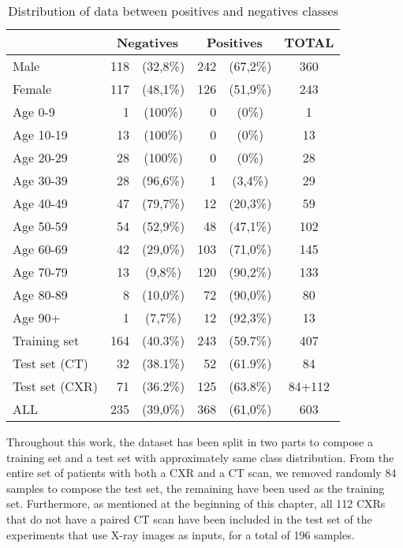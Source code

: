 \begin{table}
    \centering
    \begin{tabular}{|l|r c|r c|c|}
        \hline
        & \multicolumn{2}{c|}{\textbf{Negatives}} & \multicolumn{2}{c|}{\textbf{Positives}} & \textbf{TOTAL} \\
        \hline
        Male    & 118 & (32,8\%) & 242 & (67,2\%) & 360 \\
        Female  & 117 & (48,1\%) & 126 & (51,9\%) & 243 \\
        \hline
        Age 0-9   &   1 &  (100\%) &   0 &    (0\%) &   1 \\
        Age 10-19 &  13 &  (100\%) &   0 &    (0\%) &  13 \\
        Age 20-29 &  28 &  (100\%) &   0 &    (0\%) &  28 \\
        Age 30-39 &  28 & (96,6\%) &   1 &  (3,4\%) &  29 \\
        Age 40-49 &  47 & (79,7\%) &  12 & (20,3\%) &  59 \\
        Age 50-59 &  54 & (52,9\%) &  48 & (47,1\%) & 102 \\
        Age 60-69 &  42 & (29,0\%) & 103 & (71,0\%) & 145 \\
        Age 70-79 &  13 &  (9,8\%) & 120 & (90,2\%) & 133 \\
        Age 80-89 &   8 & (10,0\%) &  72 & (90,0\%) &  80 \\
        Age 90+   &   1 &  (7,7\%) &  12 & (92,3\%) &  13 \\
        \hline
        \hline
        Training set   & 164 & (40.3\%) & 243 & (59.7\%) &    407 \\
        Test set (CT)  &  32 & (38.1\%) &  52 & (61.9\%) &     84 \\
        Test set (CXR) &  71 & (36.2\%) & 125 & (63.8\%) & 84+112 \\
        \hline
        \hline
        ALL       & 235 & (39,0\%) & 368 & (61,0\%) & 603 \\
        \hline
    \end{tabular}
    \caption{Distribution of data between positives and negatives classes}
    \label{tab:pos_neg_distribution}
\end{table}

Throughout this work, the dataset has been split in two parts to compose a training set and a test set with approximately same class distribution.
From the entire set of patients with both a CXR and a CT scan, we removed randomly 84 samples to compose the test set, the remaining have been used as the training set.
Furthermore, as mentioned at the beginning of this chapter, all 112 CXRs that do not have a paired CT scan have been included in the test set of the experiments that use X-ray images as inputs, for a total of 196 samples.
